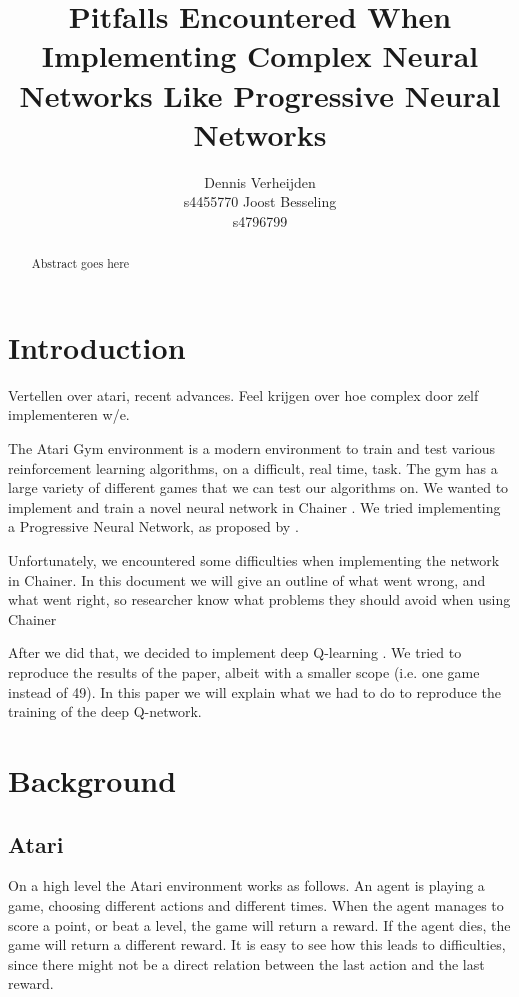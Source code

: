 \documentclass{article}
\title{Pitfalls Encountered When Implementing Complex Neural Networks Like Progressive Neural Networks}
\author{
  Dennis Verheijden\\
  s4455770
  \And
  Joost Besseling\\
  s4796799
}
\begin{document}

\maketitle

\begin{abstract}
  Abstract goes here
\end{abstract}

\section{Introduction}
Vertellen over atari, recent advances. Feel krijgen over hoe complex door zelf implementeren w/e.

The Atari Gym \cite{1606.01540} environment is a modern environment to train and test various reinforcement learning algorithms, on a difficult, real time, task. The gym has a large variety of different games that we can test our algorithms on. We wanted to implement and train a novel neural network in Chainer \cite{chainer_learningsys2015}. We tried implementing a Progressive Neural Network, as proposed by \cite{rusu2016progressive}. 

Unfortunately, we encountered some difficulties when implementing the network in Chainer. In this document we will give an outline of what went wrong, and what went right, so researcher know what problems they should avoid when using Chainer %

After we did that, we decided to implement deep Q-learning \cite{mnih2015human}. We tried to reproduce the results of the paper, albeit with a smaller scope (i.e. one game instead of 49). In this paper we will explain what we had to do to reproduce the training of the deep Q-network. 

\section{Background}

\subsection{Atari}

On a high level the Atari environment works as follows. An agent is playing a game, choosing different actions and different times. When the agent manages to score a point, or beat a level, the game will return a reward. If the agent dies, the game will return a different reward. It is easy to see how this leads to difficulties, since there might not be a direct relation between the last action and the last reward. 
\end{document}
